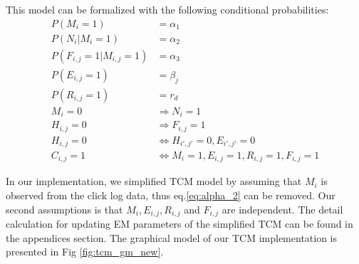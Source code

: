 This model can be formalized with the following conditional probabilities:
\begin{align}
	P(M_i=1) &= \alpha_1 \\
	\label{eq:alpha_2}
	P(N_i|M_i=1) &= \alpha_2 \\
	P(F_{i,j}=1|M_{i,j}=1) &= \alpha_3 \\
	P(E_{i,j}=1) &= \beta_j \\
	P(R_{i,j}=1) &= r_d \\
	M_i = 0 &\Rightarrow N_i = 1\\
	H_{i,j} = 0 &\Rightarrow F_{i,j} = 1\\
	H_{i,j} = 0 &\Leftrightarrow H_{i',j'} = 0, E_{i',j'} = 0\\
	C_{i,j} = 1 &\Leftrightarrow M_i = 1, E_{i,j} = 1, R_{i,j} = 1, F_{i,j} = 1
\end{align}

In our implementation, we simplified TCM model by assuming that $M_i$ is observed from the click log data, thus eq.\ref{eq:alpha_2} can be removed.
Our second assumptions is that $M_i, E_{i,j},R_{i,j}$ and $F_{i,j}$ are independent.
The detail calculation for updating EM parameters of the simplified TCM can be found in the appendices section.
The graphical model of our TCM implementation is presented in Fig \ref{fig:tcm_gm_new}.

